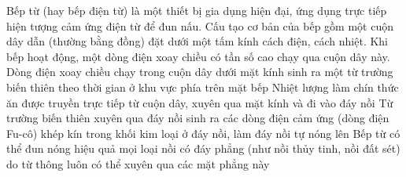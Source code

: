 	\begin{ex}%
		Bếp từ (hay bếp điện từ) là một thiết bị gia dụng hiện đại, ứng dụng trực tiếp hiện tượng cảm ứng điện từ để đun nấu. Cấu tạo cơ bản của bếp gồm một cuộn dây dẫn (thường bằng đồng) đặt dưới một tấm kính cách điện, cách nhiệt. Khi bếp hoạt động, một dòng điện xoay chiều có tần số cao chạy qua cuộn dây này.
		\choiceTFt
		{\True Dòng điện xoay chiều chạy trong cuộn dây dưới mặt kính sinh ra một từ trường biến thiên theo thời gian ở khu vực phía trên mặt bếp}
		{Nhiệt lượng làm chín thức ăn được truyền trực tiếp từ cuộn dây, xuyên qua mặt kính và đi vào đáy nồi}
		{\True Từ trường biến thiên xuyên qua đáy nồi sinh ra các dòng điện cảm ứng (dòng điện Fu-cô) khép kín trong khối kim loại ở đáy nồi, làm đáy nồi tự nóng lên}
		{Bếp từ có thể đun nóng hiệu quả mọi loại nồi có đáy phẳng (như nồi thủy tinh, nồi đất sét) do từ thông luôn có thể xuyên qua các mặt phẳng này}
	\end{ex}

